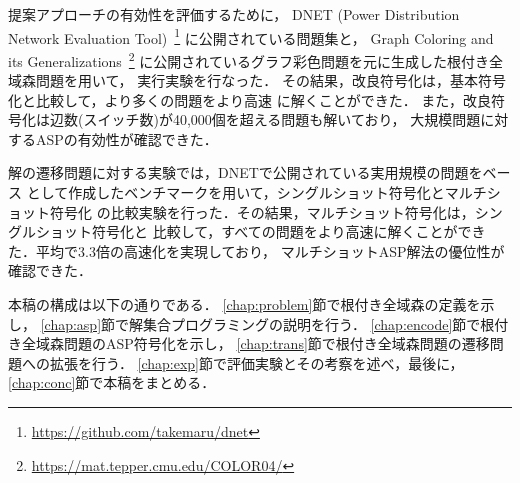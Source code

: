 提案アプローチの有効性を評価するために，
DNET (Power Distribution Network Evaluation Tool)~\footnote{%
\url{https://github.com/takemaru/dnet}}
に公開されている問題集と，
Graph Coloring and its Generalizations~\footnote{%
\url{https://mat.tepper.cmu.edu/COLOR04/}}
に公開されているグラフ彩色問題を元に生成した根付き全域森問題を用いて，
実行実験を行なった．
その結果，改良符号化は，基本符号化と比較して，より多くの問題をより高速
に解くことができた．
また，改良符号化は辺数(スイッチ数)が40,000個を超える問題も解いており，
大規模問題に対するASPの有効性が確認できた．

%
解の遷移問題に対する実験では，DNETで公開されている実用規模の問題をベース
として作成したベンチマークを用いて，シングルショット符号化とマルチショット符号化
の比較実験を行った．その結果，マルチショット符号化は，シングルショット符号化と
比較して，すべての問題をより高速に解くことができた．平均で3.3倍の高速化を実現しており，
マルチショットASP解法の優位性が確認できた．


本稿の構成は以下の通りである．
\ref{chap:problem}節で根付き全域森の定義を示し，
\ref{chap:asp}節で解集合プログラミングの説明を行う．
\ref{chap:encode}節で根付き全域森問題のASP符号化を示し，
\ref{chap:trans}節で根付き全域森問題の遷移問題への拡張を行う．
\ref{chap:exp}節で評価実験とその考察を述べ，最後に，
\ref{chap:conc}節で本稿をまとめる．

